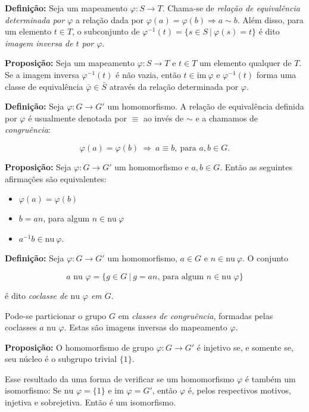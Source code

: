 \documentclass[11pt]{article}
\providecommand{\tightlist}{%
      \setlength{\itemsep}{0pt}\setlength{\parskip}{0pt}}
\begin{document}
\textbf{Definição:} Seja um mapeamento \(\varphi: S \longrightarrow T\).
Chama-se de \emph{relação de equivalência determinada por \(\varphi\)} a
relação dada por \(\varphi(a) = \varphi(b) \Rightarrow a \sim b\). Além
disso, para um elemento \(t\in T\), o subconjunto de
\(\varphi^{-1}(t) = \{s \in S\ | \ \varphi(s) = t\}\) é dito
\emph{imagem inversa de \(t\) por \(\varphi\)}.

\textbf{Proposição:} Seja um mapeamento \(\varphi: S \longrightarrow T\)
e \(t \in T\) um elemento qualquer de \(T\). Se a imagem inversa
\(\varphi^{-1}(t)\) é não vazia, então \(t \in \text{im}\ \varphi\) e
\(\varphi^{-1}(t)\) forma uma classe de equivalência
\(\bar{\varphi}\in \bar{S}\) através da relação determinada por
\(\varphi\).

\textbf{Definição:} Seja \(\varphi: G\longrightarrow G'\) um
homomorfismo. A relação de equivalência definida por \(\varphi\) é
usualmente denotada por \(\equiv\) ao invés de \(\sim\) e a chamamos de
\emph{congruência}:

\[\varphi(a) = \varphi(b) \ \Rightarrow \ a \equiv b, \ \text{para }a,b \in G.\]

\textbf{Proposição:} Seja \(\varphi: G\longrightarrow G'\) um
homomorfismo e \(a,b \in G\). Então as seguintes afirmações são
equivalentes:

\begin{itemize}
\tightlist
\item
  \(\varphi(a) = \varphi(b)\)
\item
  \(b = an\), para algum \(n\in \text{nu} \ \varphi\)
\item
  \(a^{-1}b \in \text{nu} \ \varphi\).
\end{itemize}

\textbf{Definição:} Seja \(\varphi: G\longrightarrow G'\) um
homomorfismo, \(a \in G\) e \(n\in\text{nu}\ \varphi\). O conjunto

\[a\text{ nu }\varphi = \{g\in G \ | \ g = an \text{, para algum } n\in\text{nu }\varphi\}\]

é dito \emph{coclasse de \(\text{nu }\varphi\) em \(G\)}.

Pode-se particionar o grupo \(G\) em \emph{classes de congruência},
formadas pelas coclasses \(a\text{ nu }\varphi\). Estas são imagens
inversas do mapeamento \(\varphi\).

\textbf{Proposição:} O homomorfismo de grupo
\(\varphi: G\longrightarrow G'\) é injetivo se, e somente se, seu núcleo
é o subgrupo trivial \(\{1\}\).

Esse resultado da uma forma de verificar se um homomorfismo \(\varphi\)
é também um isomorfismo: Se \(\text{nu }\varphi = \{1\}\) e
\(\text{im } \varphi = G'\), então \(\varphi\) é, pelos respectivos
motivos, injetiva e sobrejetiva. Então é um isomorfismo.
\end{document}
